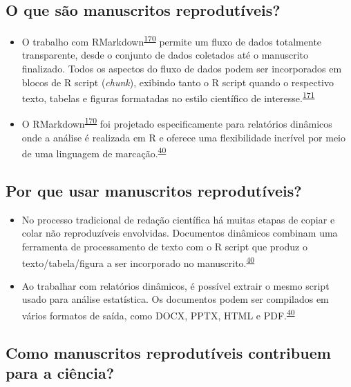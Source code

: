 \documentclass[
  a4paper,
]{book}
\begin{document}
\hypertarget{o-que-suxe3o-manuscritos-reprodutuxedveis}{%
\subsection{O que são manuscritos reprodutíveis?}\label{o-que-suxe3o-manuscritos-reprodutuxedveis}}

\begin{itemize}
\item
  O trabalho com RMarkdown\textsuperscript{\protect\hyperlink{ref-R-rmarkdown}{170}} permite um fluxo de dados totalmente transparente, desde o conjunto de dados coletados até o manuscrito finalizado. Todos os aspectos do fluxo de dados podem ser incorporados em blocos de R script (\emph{chunk}), exibindo tanto o R script quando o respectivo texto, tabelas e figuras formatadas no estilo científico de interesse.\textsuperscript{\protect\hyperlink{ref-holmes2021}{171}}
\item
  O RMarkdown\textsuperscript{\protect\hyperlink{ref-R-rmarkdown}{170}} foi projetado especificamente para relatórios dinâmicos onde a análise é realizada em R e oferece uma flexibilidade incrível por meio de uma linguagem de marcação.\textsuperscript{\protect\hyperlink{ref-mair2016}{40}}
\end{itemize}

\hypertarget{por-que-usar-manuscritos-reprodutuxedveis}{%
\subsection{Por que usar manuscritos reprodutíveis?}\label{por-que-usar-manuscritos-reprodutuxedveis}}

\begin{itemize}
\item
  No processo tradicional de redação científica há muitas etapas de copiar e colar não reproduzíveis envolvidas. Documentos dinâmicos combinam uma ferramenta de processamento de texto com o R script que produz o texto/tabela/figura a ser incorporado no manuscrito.\textsuperscript{\protect\hyperlink{ref-mair2016}{40}}
\item
  Ao trabalhar com relatórios dinâmicos, é possível extrair o mesmo script usado para análise estatística. Os documentos podem ser compilados em vários formatos de saída, como DOCX, PPTX, HTML e PDF.\textsuperscript{\protect\hyperlink{ref-mair2016}{40}}
\end{itemize}

\hypertarget{como-manuscritos-reprodutuxedveis-contribuem-para-a-ciuxeancia}{%
\subsection{Como manuscritos reprodutíveis contribuem para a ciência?}\label{como-manuscritos-reprodutuxedveis-contribuem-para-a-ciuxeancia}}
\end{document}
